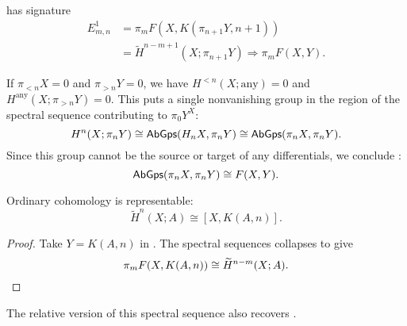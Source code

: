 \begin{definition}\label{FedererSSeq}
 has signature
\begin{align*}
E^1_{m, n} & = \pi_m F(X, K(\pi_{n+1} Y, n+1)) \\
& = \widetilde H^{n-m+1}(X; \pi_{n+1} Y) \Rightarrow \pi_m F(X, Y).
\end{align*}
\end{definition}

\begin{remark}
If $\pi_{< n} X = 0$ and $\pi_{> n} Y = 0$, we have $H^{< n}(X; \text{any}) = 0$ and $H^{\text{any}}(X; \pi_{> n} Y) = 0$.
This puts a single nonvanishing group in the region of the spectral sequence contributing to $\pi_0 Y^X$: \[H^n(X; \pi_n Y) \cong \mathsf{AbGps}(H_n X, \pi_n Y) \cong \mathsf{AbGps}(\pi_n X, \pi_n Y).\]
Since this group cannot be the source or target of any differentials, we conclude : \[\mathsf{AbGps}(\pi_n X, \pi_n Y) \cong F(X, Y).\]
\end{remark}

\begin{corollary}\label{OrdinaryCohIsRepresentable}
Ordinary cohomology is representable: \[\widetilde H^n(X; A) \cong [X, K(A, n)].\]
\end{corollary}
\begin{proof}
Take $Y = K(A, n)$ in .
The spectral sequences collapses to give \[\pi_m F(X, K(A, n)) \cong \widetilde H^{n-m}(X; A). \qedhere\]
\end{proof}

\begin{remark}
The relative version of this spectral sequence also recovers .
\end{remark}

